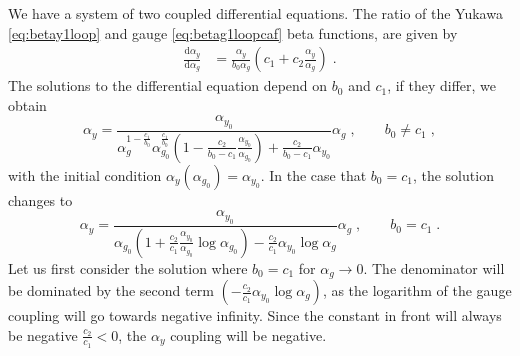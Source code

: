 We have a system of two coupled differential equations. The ratio of the Yukawa \eqref{eq:betay1loop} and gauge \eqref{eq:betag1loopcaf} beta functions, are given by
\begin{align}
   \frac{\text{d}\alpha_y}{\text{d}\alpha_g}&= \frac{\alpha_y}{b_0 \alpha_g} \left( c_1 + c_2 \frac{\alpha_y}{\alpha_g} \right)\;.
\end{align}
The solutions to the differential equation depend on $b_0$ and $c_1$, if they differ, we obtain
\begin{equation}
    \alpha_y=\frac{\alpha_{y_0}}{ \alpha_g^{1-\frac{c_1}{b_0}}\alpha_{g_0}^{\frac{c_1}{b_0}}\left(1-\frac{c_2}{b_0-c_1}\frac{\alpha_{y_0}}{\alpha_{g_0}}\right)+\frac{c_2}{b_0-c_1}\alpha_{y_0} }\alpha_g\;,\quad\quad b_0\neq c_1\;,
\end{equation}
with the initial condition $\alpha_y(\alpha_{g_0})=\alpha_{y_{0}}$. In the case that $b_0=c_1$, the solution changes to 
\begin{equation}
    \alpha_y=\frac{\alpha_{y_0}}{\alpha_{g_0}\left(1+\frac{c_2}{c_1}\frac{\alpha_{y_0}}{\alpha_{g_0}}\log\alpha_{g_0}\right)-\frac{c_2}{c_1}\alpha_{y_0}\log \alpha_g }\alpha_g\;,\quad\quad b_0=c_1\;.\label{eq:ysolb0c1}
\end{equation}
Let us first consider the solution where $b_0=c_1$ for $\alpha_g\to0$. The denominator will be dominated by the second term  $(-\frac{c_2}{c_1}\alpha_{y_0}\log \alpha_g) $, as the logarithm of the gauge coupling will go towards negative infinity. Since the constant in front will always be negative $\frac{c_2}{c_1}<0$, the $\alpha_y$ coupling will be negative.

